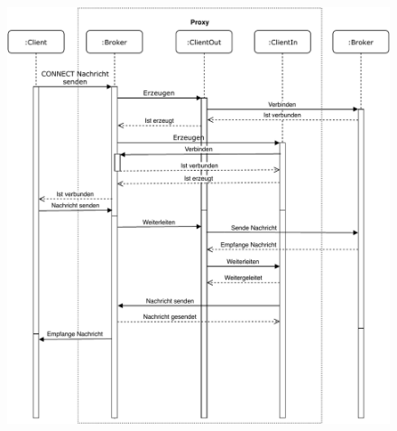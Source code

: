     \begin{figure}[!h]%
        \centering
        \includegraphics[width=14cm]{tex/bilder/4_konzept/Sequenz.pdf}
        \label{fig:sequenzdiagramm}
    \end{figure}
